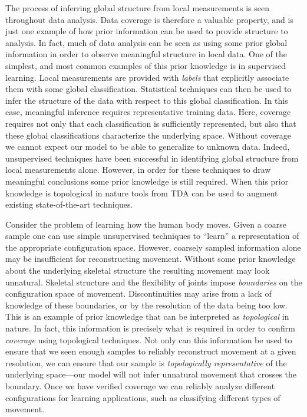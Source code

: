The process of inferring global structure from local measurements is seen throughout data analysis.
Data coverage is therefore a valuable property, and is just one example of how prior information can be used to provide structure to analysis.
In fact, much of data analysis can be seen as using some prior global information in order to observe meaningful structure in local data.
One of the simplest, and most common examples of this prior knowledge is in supervised learning.
Local measurements are provided with \emph{labels} that explicitly associate them with some global classification.
Statistical techniques can then be used to infer the structure of the data with respect to this global classification.
In this case, meaningful inference requires representative training data.
Here, coverage requires not only that each classification is sufficiently represented, but also that these global classifications characterize the underlying space.
Without coverage we cannot expect our model to be able to generalize to unknown data.
Indeed, unsupervised techniques have been successful in identifying global structure from local measurements alone.
However, in order for these techniques to draw meaningful conclusions some prior knowledge is still required.
When this prior knowledge is topological in nature tools from TDA can be used to augment existing state-of-the-art techniques.

Consider the problem of learning how the human body moves.
Given a coarse sample one can use simple unsupervised techniques to ``learn'' a representation of the appropriate configuration space.
However, coarsely sampled information alone may be insufficient for reconstructing movement.
Without some prior knowledge about the underlying skeletal structure the resulting movement may look unnatural.
Skeletal structure and the flexibility of joints impose \emph{boundaries} on the configuration space of movement.
Discontinuities may arise from a lack of knowledge of these boundaries, or by the resolution of the data being too low.
This is an example of prior knowledge that can be interpreted as \emph{topological} in nature.
In fact, this information is precisely what is required in order to confirm \emph{coverage} using topological techniques.
Not only can this information be used to ensure that we seen enough samples to reliably reconstruct movement at a given resolution, we can ensure that our sample is \emph{topologically representative} of the underlying space---our model will not infer unnatural movement that crosses the boundary.
Once we have verified coverage we can reliably analyze different configurations for learning applications, such as classifying different types of movement.

